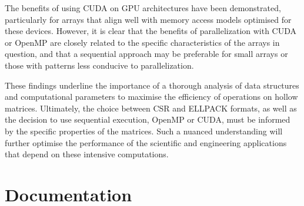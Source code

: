 \documentclass[12pt,oneside]{book} %
\begin{document}
The benefits of using CUDA on GPU architectures have been demonstrated,
particularly for arrays that align well with memory access models optimised for
these devices. However, it is clear that the benefits of parallelization with
CUDA or OpenMP are closely related to the specific characteristics of the
arrays in question, and that a sequential approach may be preferable for small
arrays or those with patterns less conducive to parallelization.

These findings underline the importance of a thorough analysis of data
structures and computational parameters to maximise the efficiency of
operations on hollow matrices. Ultimately, the choice between CSR and ELLPACK
formats, as well as the decision to use sequential execution, OpenMP or CUDA,
must be informed by the specific properties of the matrices. Such a nuanced
understanding will further optimise the performance of the scientific and
engineering applications that depend on these intensive computations.




\appendix
\chapter{Documentation}
\end{document}

